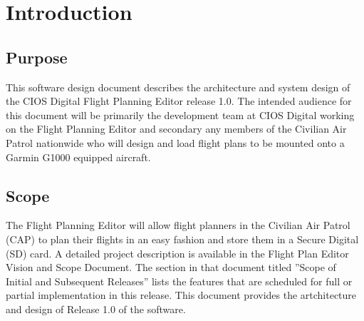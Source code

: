 \documentclass[12pt, letterpaper]{article}
\begin{document}
\newpage


\section{Introduction}
  \subsection{Purpose}
    This software design document describes the architecture and system design of the CIOS Digital Flight Planning Editor release 1.0.
    The intended audience for this document will be primarily the development team at CIOS Digital working on the Flight Planning Editor and secondary any members of the Civilian Air Patrol nationwide who will design and load flight plans to be mounted onto a Garmin G1000 equipped aircraft.

  \subsection{Scope}
    The Flight Planning Editor will allow flight planners in the Civilian Air Patrol (CAP) to plan their flights in an easy fashion and store them in a Secure Digital (SD) card. A detailed project description is available in the Flight Plan Editor Vision and Scope Document. The section in that document titled ”Scope of Initial and Subsequent Releases” lists the features that are scheduled for full or partial implementation in this release.
    This document provides the artchitecture and design of Release 1.0 of the software.

\end{document}
